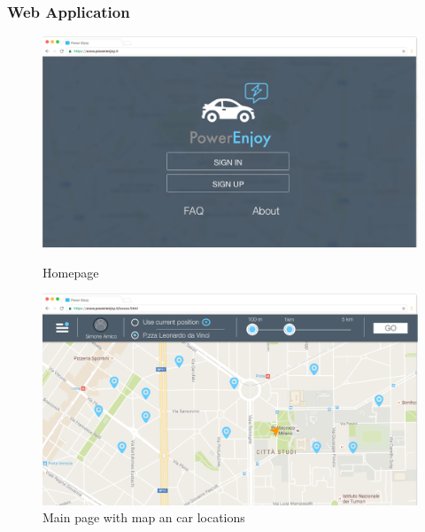 \documentclass[12pt]{article}
\begin{document}
 	 \subsubsection{Web Application}
 	  	\begin{figure}
		\centering	
		\vspace{-14cm}		 
		 \includegraphics[scale=0.28]{Images/webApp/Homepage.png}
		 \caption{Homepage}
		 \centering
 	 	  \includegraphics[scale=0.28]{Images/webApp/MainSearch.png}
		  \caption{Main page with map an car locations}
 	 	\end{figure}
 	 	
\end{document}
